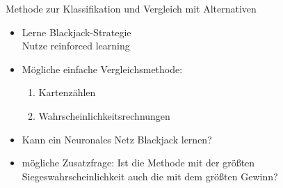 \documentclass[aspectratio=1610, 9pt]{beamer}
\begin{document}
\begin{frame}{Methode zur Klassifikation und Vergleich mit Alternativen}
  \begin{itemize}
    \item Lerne Blackjack-Strategie \\
    \rightarrow{} Nutze reinforced learning\\
    \item Mögliche einfache Vergleichsmethode:
    \begin{enumerate}
      \item Kartenzählen
      \item Wahrscheinlichkeitsrechnungen
    \end{enumerate}
    \item Kann ein Neuronales Netz Blackjack lernen?
    \item mögliche Zusatzfrage: Ist die Methode mit der größten Siegeswahrscheinlichkeit auch die mit dem größten Gewinn?
  \end{itemize}
\end{frame}
\end{document}
